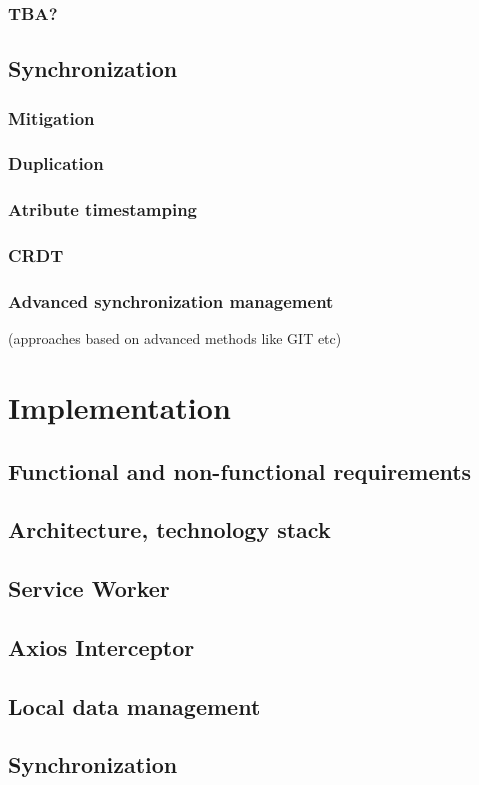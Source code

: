 \documentclass[
  digital,     %
  color,       %
  oneside,     %
  nosansbold,  %
  nocolorbold, %
  lof,         %
  lot,         %
]{fithesis4}
\begin{document}
\subsection{TBA?}
\section{Synchronization}
\subsection{Mitigation}
\subsection{Duplication}
\subsection{Atribute timestamping}
\subsection{CRDT}
\subsection{Advanced synchronization management}
(approaches based on advanced methods like GIT etc)

\chapter{Implementation}
\section{Functional and non-functional requirements}
\section{Architecture, technology stack}
\section{Service Worker}
\section{Axios Interceptor}
\section{Local data management}
\section{Synchronization}
\end{document}
